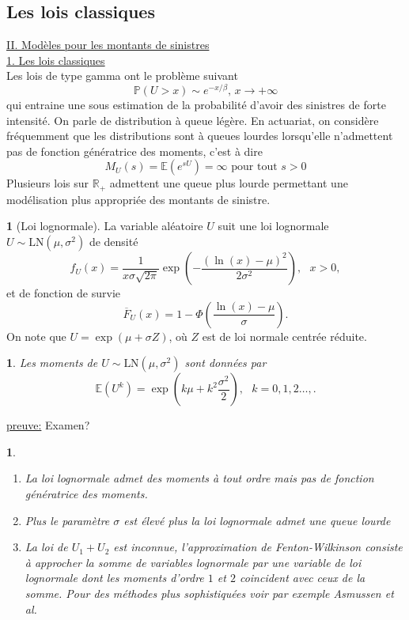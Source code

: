 \documentclass[8pt,notheorems]{beamer}
\def \E{\mathbb E}
\def \P {\mathbb P}
\newcommand{\R}{\mathbb{R}}
\newtheorem{prop}{\translate{Proposition}}
\newtheorem{remark}{\translate{Remark}}
\theoremstyle{definition}
\newtheorem{definition}{\translate{Definition}}
\theoremstyle{example}
\theoremstyle{mystyle}
\theoremstyle{plain}
\begin{document}
\subsection{Les lois classiques}
\begin{frame}[allowframebreaks]
\underline{II. Modèles pour les montants de sinistres}\\
\underline{1. Les lois classiques}\\
Les lois de type gamma ont le problème suivant
$$
\P(U>x)\sim e^{-x/\beta}\text{, }x\rightarrow+\infty
$$
qui entraine une sous estimation de la probabilité d'avoir des sinistres de forte intensité. On parle de distribution à queue légère. En actuariat, on considère fréquemment que les distributions sont à queues lourdes lorsqu'elle n'admettent pas de fonction génératrice des moments, c'est à dire
$$
M_U(s) = \E(e^{sU})=\infty\text{ pour tout }s>0
$$
Plusieurs lois sur $\R_+$ admettent une queue plus lourde permettant une modélisation plus appropriée des montants de sinistre.
\begin{definition}[Loi lognormale]
La variable aléatoire $U$ suit une loi lognormale $U\sim\text{LN}(\mu,\sigma^{2})$ de densité
$$
f_{U}(x)=\frac{1}{x\sigma\sqrt{2\pi}}\exp\left(-\frac{(\ln(x)-\mu)^2}{2\sigma^2}\right),\text{ }x>0,
$$
et de fonction de survie
$$
\overline{F}_U(x) = 1-\Phi\left(\frac{\ln(x)-\mu}{\sigma}\right).
$$
On note que $U=\exp(\mu+\sigma Z)$, où $Z$ est de loi normale centrée réduite.
\end{definition}
\begin{prop}
Les moments de $U\sim\text{LN}(\mu,\sigma^2)$ sont données par
$$
\E(U^k)=\exp\left(k\mu+k^2\frac{\sigma^2}{2}\right),\text{ }k=0,1,2\ldots,.
$$
\end{prop}
\underline{preuve:} Examen?
\begin{remark}
\begin{enumerate}
\item La loi lognormale admet des moments à tout ordre mais pas de fonction génératrice des moments.
\item Plus le paramètre $\sigma$ est élevé plus la loi lognormale admet une queue lourde
\item La loi de $U_1+U_2$ est inconnue, l'approximation de Fenton-Wilkinson \cite{fenton1960sum} consiste à approcher la somme de variables lognormale par une variable de loi lognormale dont les moments d'ordre $1$ et $2$ coincident avec ceux de la somme. Pour des méthodes plus sophistiquées voir par exemple Asmussen et al. \cite{asmussen2016orthonormal}
\end{enumerate}

\end{remark}
\end{frame}
\end{document}
